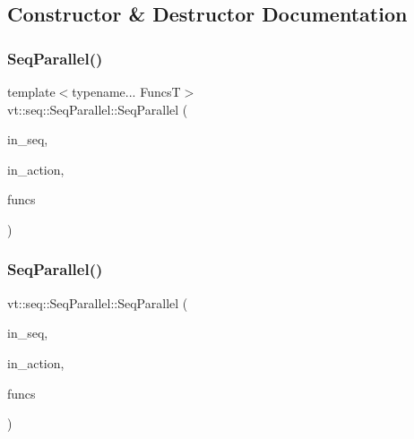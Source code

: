 \subsection{Constructor \& Destructor Documentation}
\mbox{\label{structvt_1_1seq_1_1_seq_parallel_a2b79a4c7f0ddc27499ad263bfd57c7da}} 
\subsubsection{\texorpdfstring{Seq\+Parallel()}{SeqParallel()}\hspace{0.1cm}{\footnotesize\ttfamily [1/3]}}
{\footnotesize\ttfamily template$<$typename... FuncsT$>$ \\
vt\+::seq\+::\+Seq\+Parallel\+::\+Seq\+Parallel (\begin{DoxyParamCaption}\item[{\hyperlink{namespacevt_1_1seq_a3b612da217ac669d39c159f134ab8434}{Seq\+Type} const \&}]{in\+\_\+seq,  }\item[{\hyperlink{namespacevt_ae0a5a7b18cc99d7b732cb4d44f46b0f3}{Action\+Type}}]{in\+\_\+action,  }\item[{FuncsT \&\&...}]{funcs }\end{DoxyParamCaption})\hspace{0.3cm}{\ttfamily [inline]}}

\mbox{\label{structvt_1_1seq_1_1_seq_parallel_a1ba47a7c08c48604178a7aac55ddc9c1}} 
\subsubsection{\texorpdfstring{Seq\+Parallel()}{SeqParallel()}\hspace{0.1cm}{\footnotesize\ttfamily [2/3]}}
{\footnotesize\ttfamily vt\+::seq\+::\+Seq\+Parallel\+::\+Seq\+Parallel (\begin{DoxyParamCaption}\item[{\hyperlink{namespacevt_1_1seq_a3b612da217ac669d39c159f134ab8434}{Seq\+Type} const \&}]{in\+\_\+seq,  }\item[{\hyperlink{namespacevt_ae0a5a7b18cc99d7b732cb4d44f46b0f3}{Action\+Type}}]{in\+\_\+action,  }\item[{\hyperlink{structvt_1_1seq_1_1_seq_parallel_a5804979becb9986676dcba10487eb8de}{Seq\+Parallel\+Func\+Type}}]{funcs }\end{DoxyParamCaption})\hspace{0.3cm}{\ttfamily [inline]}}

